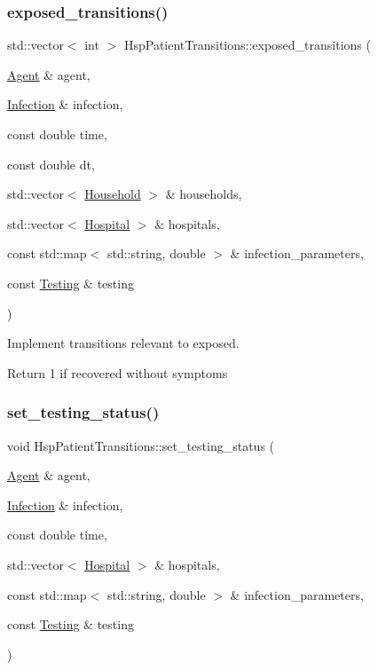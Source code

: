 \subsubsection{\texorpdfstring{exposed\+\_\+transitions()}{exposed\_transitions()}}
{\footnotesize\ttfamily std\+::vector$<$ int $>$ Hsp\+Patient\+Transitions\+::exposed\+\_\+transitions (\begin{DoxyParamCaption}\item[{\hyperlink{classAgent}{Agent} \&}]{agent,  }\item[{\hyperlink{classInfection}{Infection} \&}]{infection,  }\item[{const double}]{time,  }\item[{const double}]{dt,  }\item[{std\+::vector$<$ \hyperlink{classHousehold}{Household} $>$ \&}]{households,  }\item[{std\+::vector$<$ \hyperlink{classHospital}{Hospital} $>$ \&}]{hospitals,  }\item[{const std\+::map$<$ std\+::string, double $>$ \&}]{infection\+\_\+parameters,  }\item[{const \hyperlink{classTesting}{Testing} \&}]{testing }\end{DoxyParamCaption})}



Implement transitions relevant to exposed. 

Return 1 if recovered without symptoms \mbox{\label{classHspPatientTransitions_a0b1b734e3e075b4fa90c5adc24809b5c}} 
\subsubsection{\texorpdfstring{set\+\_\+testing\+\_\+status()}{set\_testing\_status()}}
{\footnotesize\ttfamily void Hsp\+Patient\+Transitions\+::set\+\_\+testing\+\_\+status (\begin{DoxyParamCaption}\item[{\hyperlink{classAgent}{Agent} \&}]{agent,  }\item[{\hyperlink{classInfection}{Infection} \&}]{infection,  }\item[{const double}]{time,  }\item[{std\+::vector$<$ \hyperlink{classHospital}{Hospital} $>$ \&}]{hospitals,  }\item[{const std\+::map$<$ std\+::string, double $>$ \&}]{infection\+\_\+parameters,  }\item[{const \hyperlink{classTesting}{Testing} \&}]{testing }\end{DoxyParamCaption})}



